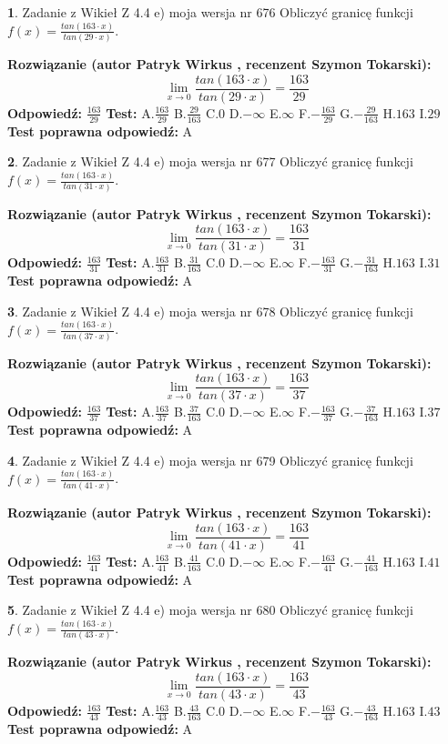 \documentclass[12pt, a4paper]{article}
\theoremstyle{definition} %
\newtheorem{zad}{}
\newcommand{\zadStart}[1]{\begin{zad}#1\newline}
\newcommand{\zadStop}{\end{zad}}
\newcommand{\rozwStart}[2]{\noindent \textbf{Rozwiązanie (autor #1 , recenzent #2): }\newline}
\newcommand{\rozwStop}{\newline}
\newcommand{\odpStart}{\noindent \textbf{Odpowiedź:}\newline}
\newcommand{\odpStop}{\newline}
\newcommand{\testStart}{\noindent \textbf{Test:}\newline}
\newcommand{\testStop}{\newline}
\newcommand{\kluczStart}{\noindent \textbf{Test poprawna odpowiedź:}\newline}
\newcommand{\kluczStop}{\newline}
\begin{document}
\zadStart{Zadanie z Wikieł Z 4.4 e) moja wersja nr 676}
Obliczyć granicę funkcji $f(x)=\frac{tan(163\cdot x)}{tan(29\cdot x)}$.
\zadStop
\rozwStart{Patryk Wirkus}{Szymon Tokarski}
$$\lim\limits_{x\to 0}\frac{tan(163\cdot x)}{tan(29\cdot x)}=
\frac{163}{29}$$
\rozwStop
\odpStart
$\frac{163}{29}$
\odpStop
\testStart
A.$\frac{163}{29}$
B.$\frac{29}{163}$
C.$0$
D.$-\infty$
E.$\infty$
F.$-\frac{163}{29}$
G.$-\frac{29}{163}$
H.$163$
I.$29$
\testStop
\kluczStart
A
\kluczStop



\zadStart{Zadanie z Wikieł Z 4.4 e) moja wersja nr 677}
Obliczyć granicę funkcji $f(x)=\frac{tan(163\cdot x)}{tan(31\cdot x)}$.
\zadStop
\rozwStart{Patryk Wirkus}{Szymon Tokarski}
$$\lim\limits_{x\to 0}\frac{tan(163\cdot x)}{tan(31\cdot x)}=
\frac{163}{31}$$
\rozwStop
\odpStart
$\frac{163}{31}$
\odpStop
\testStart
A.$\frac{163}{31}$
B.$\frac{31}{163}$
C.$0$
D.$-\infty$
E.$\infty$
F.$-\frac{163}{31}$
G.$-\frac{31}{163}$
H.$163$
I.$31$
\testStop
\kluczStart
A
\kluczStop



\zadStart{Zadanie z Wikieł Z 4.4 e) moja wersja nr 678}
Obliczyć granicę funkcji $f(x)=\frac{tan(163\cdot x)}{tan(37\cdot x)}$.
\zadStop
\rozwStart{Patryk Wirkus}{Szymon Tokarski}
$$\lim\limits_{x\to 0}\frac{tan(163\cdot x)}{tan(37\cdot x)}=
\frac{163}{37}$$
\rozwStop
\odpStart
$\frac{163}{37}$
\odpStop
\testStart
A.$\frac{163}{37}$
B.$\frac{37}{163}$
C.$0$
D.$-\infty$
E.$\infty$
F.$-\frac{163}{37}$
G.$-\frac{37}{163}$
H.$163$
I.$37$
\testStop
\kluczStart
A
\kluczStop



\zadStart{Zadanie z Wikieł Z 4.4 e) moja wersja nr 679}
Obliczyć granicę funkcji $f(x)=\frac{tan(163\cdot x)}{tan(41\cdot x)}$.
\zadStop
\rozwStart{Patryk Wirkus}{Szymon Tokarski}
$$\lim\limits_{x\to 0}\frac{tan(163\cdot x)}{tan(41\cdot x)}=
\frac{163}{41}$$
\rozwStop
\odpStart
$\frac{163}{41}$
\odpStop
\testStart
A.$\frac{163}{41}$
B.$\frac{41}{163}$
C.$0$
D.$-\infty$
E.$\infty$
F.$-\frac{163}{41}$
G.$-\frac{41}{163}$
H.$163$
I.$41$
\testStop
\kluczStart
A
\kluczStop



\zadStart{Zadanie z Wikieł Z 4.4 e) moja wersja nr 680}
Obliczyć granicę funkcji $f(x)=\frac{tan(163\cdot x)}{tan(43\cdot x)}$.
\zadStop
\rozwStart{Patryk Wirkus}{Szymon Tokarski}
$$\lim\limits_{x\to 0}\frac{tan(163\cdot x)}{tan(43\cdot x)}=
\frac{163}{43}$$
\rozwStop
\odpStart
$\frac{163}{43}$
\odpStop
\testStart
A.$\frac{163}{43}$
B.$\frac{43}{163}$
C.$0$
D.$-\infty$
E.$\infty$
F.$-\frac{163}{43}$
G.$-\frac{43}{163}$
H.$163$
I.$43$
\testStop
\kluczStart
A
\kluczStop
\end{document}
